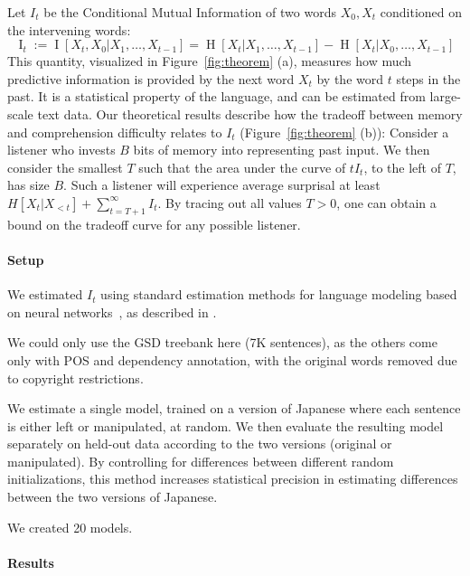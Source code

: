 \documentclass[11pt,a4paper]{article}
\newcounter{theorem}
\begin{document}
Let $I_t$ be the Conditional Mutual Information of two words $X_0, X_t$ conditioned on the intervening words:
\begin{equation}
        \operatorname{I}_t := \operatorname{I}[X_t, X_0 | X_1, \dots, X_{t-1}] = \operatorname{H}[X_t|X_1, \dots, X_{t-1}] - \operatorname{H}[X_t|X_0, \dots, X_{t-1}] 
\end{equation}
This quantity, visualized in Figure~\ref{fig:theorem} (a), measures how much predictive information is provided by the next word $X_t$ by the word $t$ steps in the past.
It is a statistical property of the language, and can be estimated from large-scale text data.
Our theoretical results describe how the tradeoff between memory and comprehension difficulty relates to $I_t$ (Figure~\ref{fig:theorem} (b)):
Consider a listener who invests $B$ bits of memory into representing past input.
We then consider the smallest $T$ such that the area under the curve of $t I_t$, to the left of $T$, has size $B$.
Such a listener will experience average surprisal at least $H[X_t| X_{<t}] + \sum_{t=T+1}^\infty I_t$. %
By tracing out all values $T >0$, one can obtain a bound on the tradeoff curve for any possible listener.


\paragraph{Setup}
We estimated $I_t$ using standard estimation methods for language modeling based on neural networks~\citep{hochreiter-long-1997}, as described in \citet{hahn2019memory}.

We could only use the GSD treebank here (7K sentences), as the others come only with POS and dependency annotation, with the original words removed due to copyright restrictions.

We estimate a single model, trained on a version of Japanese where each sentence is either left or manipulated, at random.
We then evaluate the resulting model separately on held-out data according to the two versions (original or manipulated).
By controlling for differences between different random initializations, this method increases statistical precision in estimating differences between the two versions of Japanese.

We created 20 models.


\paragraph{Results}
\end{document}
